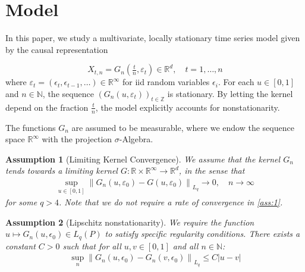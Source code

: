 \documentclass[10pt, a4paper]{article}
\theoremstyle{assumption}
\newtheorem{assumption}{Assumption}[section]
\theoremstyle{definition}
\theoremstyle{theorem}
\begin{document}
\section{Model}
In this paper, we study a multivariate, locally stationary time series model given by the causal representation

\begin{equation}
    X_{t,n} = G_n\left(\tfrac{t}{n}, \varepsilon_t\right) \in \mathbb{R}^d, \quad t = 1, \dots, n
    \label{eq: dgp}
\end{equation} 
where ${\varepsilon}_t = (\epsilon_t, \epsilon_{t-1}, \dots) \in \mathbb{R}^\infty$ for iid random variables $\epsilon_i$. For each $u \in [0, 1]$ and $n \in \mathbb{N}$, the sequence $(G_n(u, \varepsilon_t))_{t \in \mathbb{Z}}$ is stationary. By letting the kernel depend on the fraction $\frac{t}{n}$, the model explicitly accounts for nonstationarity.

The functions $G_n$ are assumed to be measurable, where we endow the sequence space $\mathbb{R}^\infty$ with the projection $\sigma$-Algebra.

\begin{assumption}[Limiting Kernel Convergence]\label{ass:1}
    We assume that the kernel $G_n$ tends towards a limiting kernel $G : \mathbb{R} \times \mathbb{R}^\infty \to \mathbb{R}^d$, in the sense that
    \begin{align*}
        \sup_{u \in [0,1]} \left\| G_n(u, \varepsilon_0) - G(u, \varepsilon_0) \right\|_{L_q} \to 0, \quad n \to \infty 
    \end{align*}
    for some $q > 4$. Note that we do not require a rate of convergence in \eqref{ass:1}.
\end{assumption}

\begin{assumption}[Lipschitz nonstationarity]\label{ass:lipschitz}
    We require the function $u \mapsto G_n(u, \epsilon_0) \in L_q(P)$ to satisfy specific regularity conditions. There exists a constant $C > 0$ such that for all $u, v \in [0, 1]$ and all $n \in \mathbb{N}$:
    \begin{align*}
        \sup_n \left\| G_n(u, \epsilon_0) - G_n(v, \epsilon_0) \right\|_{L_q} \le C |u - v|
    \end{align*} 
\end{assumption}
\end{document}

